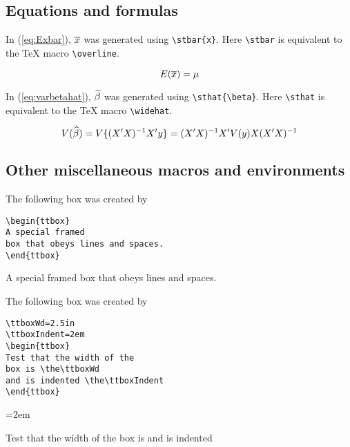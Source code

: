 \subsection{Equations and formulas}

In (\ref{eq:Exbar}), $\overline{x}$ was generated using
\verb+\stbar{x}+.  Here \verb+\stbar+ is equivalent to the \TeX{} macro
\verb+\overline+.

\begin{equation}
E(\overline{x}) = \mu
\label{eq:Exbar}
\end{equation}

In (\ref{eq:varbetahat}), $\widehat{\beta}$ was generated using
\verb+\sthat{\beta}+.  Here \verb+\sthat+ is equivalent to the \TeX{} macro
\verb+\widehat+.

\begin{equation}
V(\widehat{\beta}) = V\{(X'X)^{-1}X'y\} = (X'X)^{-1}X'V(y)X(X'X)^{-1}
\label{eq:varbetahat}
\end{equation}

\subsection{Other miscellaneous macros and environments}

The following box was created by

\begin{stverbatim}
\begin{verbatim}
\begin{ttbox}
A special framed
box that obeys lines and spaces.
\end{ttbox}
\end{verbatim}
\end{stverbatim}

\begin{ttbox}
A special framed
box that obeys lines and spaces.
\end{ttbox}

The following box was created by

\begin{stverbatim}
\begin{verbatim}
\ttboxWd=2.5in
\ttboxIndent=2em
\begin{ttbox}
Test that the width of the
box is \the\ttboxWd
and is indented \the\ttboxIndent
\end{ttbox}
\end{verbatim}
\end{stverbatim}

\ttboxWd=2.5in
\ttboxIndent=2em
\begin{ttbox}
Test that the width of the
box is \the\ttboxWd
and is indented \the\ttboxIndent
\end{ttbox}

\endinput
